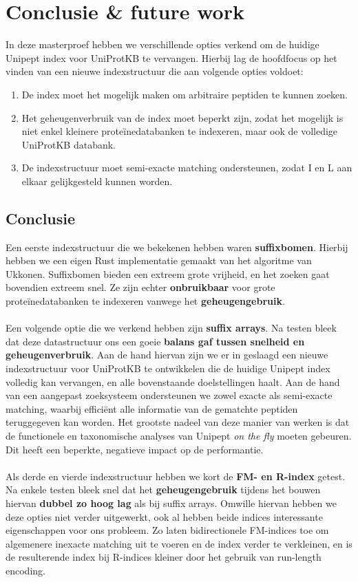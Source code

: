 \chapter{Conclusie \& future work}\label{ch:conclusie}
In deze masterproef hebben we verschillende opties verkend om de huidige Unipept index voor UniProtKB te vervangen.
Hierbij lag de hoofdfocus op het vinden van een nieuwe indexstructuur die aan volgende opties voldoet:
\begin{enumerate}
    \item De index moet het mogelijk maken om arbitraire peptiden te kunnen zoeken.
    \item Het geheugenverbruik van de index moet beperkt zijn, zodat het mogelijk is niet enkel kleinere proteïnedatabanken te indexeren, maar ook de volledige UniProtKB databank.
    \item De indexstructuur moet semi-exacte matching ondersteunen, zodat I en L aan elkaar gelijkgesteld kunnen worden.
\end{enumerate}

\section{Conclusie}
Een eerste indexstructuur die we bekekenen hebben waren \textbf{suffixbomen}.
Hierbij hebben we een eigen Rust implementatie gemaakt van het algoritme van Ukkonen.
Suffixbomen bieden een extreem grote vrijheid, en het zoeken gaat bovendien extreem snel.
Ze zijn echter \textbf{onbruikbaar} voor grote proteïnedatabanken te indexeren vanwege het \textbf{geheugengebruik}.
\\ \\
Een volgende optie die we verkend hebben zijn \textbf{suffix arrays}.
Na testen bleek dat deze datastructuur ons een goeie \textbf{balans gaf tussen snelheid en geheugenverbruik}.
Aan de hand hiervan zijn we er in geslaagd een nieuwe indexstructuur voor UniProtKB te ontwikkelen die de huidige Unipept index volledig kan vervangen, en alle bovenstaande doelstellingen haalt.
Aan de hand van een aangepast zoeksysteem ondersteunen we zowel exacte als semi-exacte matching, waarbij efficiënt alle informatie van de gematchte peptiden teruggegeven kan worden.
Het grootste nadeel van deze manier van werken is dat de functionele en taxonomische analyses van Unipept \textit{on the fly} moeten gebeuren.
Dit heeft een beperkte, negatieve impact op de performantie.
\\ \\
Als derde en vierde indexstructuur hebben we kort de \textbf{FM- en R-index} getest.
Na enkele testen bleek snel dat het \textbf{geheugengebruik} tijdens het bouwen hiervan \textbf{dubbel zo hoog lag} als bij suffix arrays.
Omwille hiervan hebben we deze opties niet verder uitgewerkt, ook al hebben beide indices interessante eigenschappen voor ons probleem.
Zo laten bidirectionele FM-indices toe om algemenere inexacte matching uit te voeren en de index verder te verkleinen, en is de resulterende index bij R-indices kleiner door het gebruik van run-length encoding.

